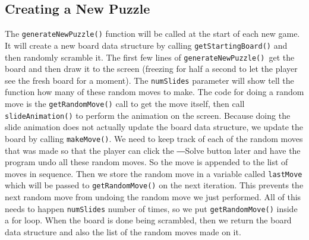 \subsection{Creating a New Puzzle}
The \texttt{generateNewPuzzle()} function will be called at the start of each new game. It will create a new board data structure by calling \texttt{getStartingBoard()} and then randomly scramble it. The first few lines of \texttt{generateNewPuzzle() }get the board and then draw it to the screen (freezing for half a second to let the player see the fresh board for a moment).
The \texttt{numSlides} parameter will show tell the function how many of these random moves to make. The code for doing a random move is the \texttt{getRandomMove()} call to get the move itself, then call \texttt{slideAnimation()} to perform the animation on the screen. Because doing the slide animation does not actually update the board data structure, we update the board by calling \texttt{makeMove()}.
We need to keep track of each of the random moves that was made so that the player can click the ―Solve button later and have the program undo all these random moves. So the move is appended to the list of moves in sequence.
Then we store the random move in a variable called \texttt{lastMove} which will be passed to \texttt{getRandomMove()} on the next iteration. This prevents the next random move from undoing the random move we just performed.
All of this needs to happen \texttt{numSlides} number of times, so we put \texttt{getRandomMove()} inside a for loop. When the board is done being scrambled, then we return the board data structure and also the list of the random moves made on it.
